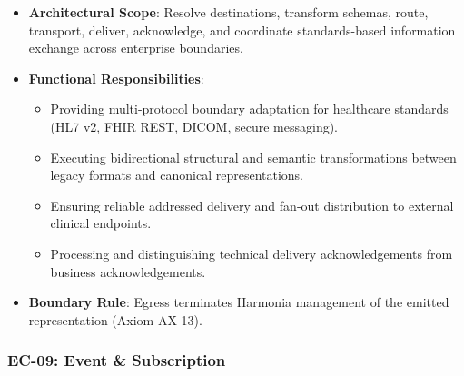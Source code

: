 \begin{itemize}

\item
\textbf{Architectural Scope}: Resolve destinations, transform schemas, route, transport, deliver, acknowledge, and coordinate standards-based information exchange across enterprise boundaries.



\item
\textbf{Functional Responsibilities}:


\begin{itemize}

\item
Providing multi-protocol boundary adaptation for healthcare standards (HL7 v2, FHIR REST, DICOM, secure messaging).



\item
Executing bidirectional structural and semantic transformations between legacy formats and canonical representations.



\item
Ensuring reliable addressed delivery and fan-out distribution to external clinical endpoints.



\item
Processing and distinguishing technical delivery acknowledgements from business acknowledgements.



\end{itemize}


\item
\textbf{Boundary Rule}: Egress terminates Harmonia management of the emitted representation (Axiom AX-13).



\end{itemize}
\label{rad:enterprise:175}
\subsubsection*{EC-09: Event \& Subscription}
\label{rad:enterprise:176}

